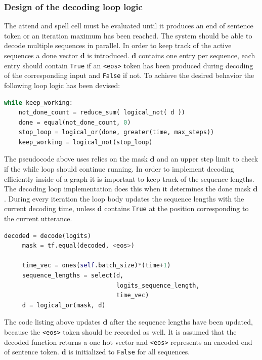 \subsubsection{Design of the decoding loop logic}
The attend and spell cell must be evaluated until it produces an end of sentence token or an iteration maximum has been reached. The system should be able to decode multiple sequences in parallel. In order to keep track of the active sequences a done vector $\mathbf{d}$ is introduced.  $\mathbf{d}$ contains one entry per sequence, each entry should contain \texttt{True} if an \texttt{<eos>} token has been produced during decoding of the corresponding input and \texttt{False} if not. 
To achieve the desired behavior the following loop logic has been devised:
\begin{lstlisting}[language=python]
while keep_working:
	not_done_count = reduce_sum( logical_not( d ))
	done = equal(not_done_count, 0)
	stop_loop = logical_or(done, greater(time, max_steps))
	keep_working = logical_not(stop_loop)
\end{lstlisting}
The pseudocode above uses relies on the mask $\mathbf{d}$ and an upper step limit to check if the while loop should continue running. In order to implement decoding efficiently inside of a graph it is important to keep track of the sequence lengths. The decoding loop implementation does this when it determines the done mask $\mathbf{d}$. During every iteration the loop body updates the sequence lengths with the current decoding time, unless $\mathbf{d}$ contains \texttt{True} at the position corresponding to the current utterance.
\begin{lstlisting}[language=python]
     decoded = decode(logits)
     mask = tf.equal(decoded, <eos>)

     time_vec = ones(self.batch_size)*(time+1)
     sequence_lengths = select(d,
                               logits_sequence_length,
                               time_vec)
     d = logical_or(mask, d)
\end{lstlisting}
The code listing above updates $\mathbf{d}$ after the sequence lengths have been updated, because the \texttt{<eos>} token should be recorded as well. It is assumed that the decoded function returns a one hot vector and \texttt{<eos>} represents an encoded end of sentence token. $\mathbf{d}$ is initialized to \texttt{False} for all sequences. 


